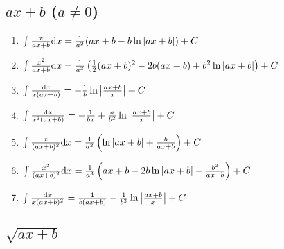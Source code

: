 	\subsection{$ax+b$ ($a\neq 0$)}
	\begin{enumerate}

	\item $ \int \frac{x}{ax+b} \mathrm{d} x = \frac{1}{a^2} (ax+b-b\ln|ax+b|) + C $

	\item $ \int \frac{x^2}{ax+b} \mathrm{d} x = \frac{1}{a^3} \left( \frac{1}{2}(ax+b)^2-2b(ax+b)+b^2\ln|ax+b| \right) + C $

	\item $ \int \frac{\mathrm{d} x}{x(ax+b)} = -\frac{1}{b}\ln \left| \frac{ax+b}{x} \right| + C $

	\item $ \int \frac{\mathrm{d} x}{x^2(ax+b)} = -\frac{1}{bx} + \frac{a}{b^2}\ln\left| \frac{ax+b}{x} \right| + C $

	\item $ \int \frac{x}{(ax+b)^2} \mathrm{d} x = \frac{1}{a^2}\left( \ln|ax+b|+\frac{b}{ax+b} \right) + C $

	\item $ \int \frac{x^2}{(ax+b)^2}\mathrm{d} x = \frac{1}{a^3} \left( ax+b-2b\ln|ax+b|-\frac{b^2}{ax+b} \right) + C $

	\item $ \int \frac{\mathrm{d} x}{x(ax+b)^2} = \frac{1}{b(ax+b)} - \frac{1}{b^2}\ln\left| \frac{ax+b}{x} \right| + C $

	\end{enumerate}

	\subsection{$\sqrt{ax+b}$}

